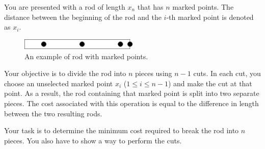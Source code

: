 You are presented with a rod of length $x_n$ that has $n$ marked points. The distance between the beginning of the rod and the $i$-th marked point is denoted as $x_i$.

\begin{figure}[h]
    \center
    \includegraphics[width=0.5\textwidth]{image/rod.png}
    \caption{An example of rod with marked points.}
\end{figure}

Your objective is to divide the rod into $n$ pieces using $n-1$ cuts. In each cut, you choose an unselected marked point $x_i$ ($1 \leq i \leq n - 1$) and make the cut at that point. As a result, the rod containing that marked point is split into two separate pieces. The cost associated with this operation is equal to the difference in length between the two resulting rods.

Your task is to determine the minimum cost required to break the rod into $n$ pieces.
You also have to show a way to perform the cuts.